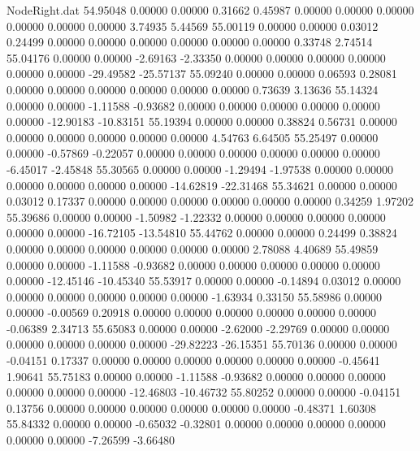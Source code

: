 \begin{filecontents}{NodeRight.dat}
  54.95048    0.00000    0.00000     0.31662    0.45987    0.00000    0.00000    0.00000    0.00000    0.00000    0.00000    3.74935    5.44569
  55.00119    0.00000    0.00000     0.03012    0.24499    0.00000    0.00000    0.00000    0.00000    0.00000    0.00000    0.33748    2.74514
  55.04176    0.00000    0.00000    -2.69163   -2.33350    0.00000    0.00000    0.00000    0.00000    0.00000    0.00000  -29.49582  -25.57137
  55.09240    0.00000    0.00000     0.06593    0.28081    0.00000    0.00000    0.00000    0.00000    0.00000    0.00000    0.73639    3.13636
  55.14324    0.00000    0.00000    -1.11588   -0.93682    0.00000    0.00000    0.00000    0.00000    0.00000    0.00000  -12.90183  -10.83151
  55.19394    0.00000    0.00000     0.38824    0.56731    0.00000    0.00000    0.00000    0.00000    0.00000    0.00000    4.54763    6.64505
  55.25497    0.00000    0.00000    -0.57869   -0.22057    0.00000    0.00000    0.00000    0.00000    0.00000    0.00000   -6.45017   -2.45848
  55.30565    0.00000    0.00000    -1.29494   -1.97538    0.00000    0.00000    0.00000    0.00000    0.00000    0.00000  -14.62819  -22.31468
  55.34621    0.00000    0.00000     0.03012    0.17337    0.00000    0.00000    0.00000    0.00000    0.00000    0.00000    0.34259    1.97202
  55.39686    0.00000    0.00000    -1.50982   -1.22332    0.00000    0.00000    0.00000    0.00000    0.00000    0.00000  -16.72105  -13.54810
  55.44762    0.00000    0.00000     0.24499    0.38824    0.00000    0.00000    0.00000    0.00000    0.00000    0.00000    2.78088    4.40689
  55.49859    0.00000    0.00000    -1.11588   -0.93682    0.00000    0.00000    0.00000    0.00000    0.00000    0.00000  -12.45146  -10.45340
  55.53917    0.00000    0.00000    -0.14894    0.03012    0.00000    0.00000    0.00000    0.00000    0.00000    0.00000   -1.63934    0.33150
  55.58986    0.00000    0.00000    -0.00569    0.20918    0.00000    0.00000    0.00000    0.00000    0.00000    0.00000   -0.06389    2.34713
  55.65083    0.00000    0.00000    -2.62000   -2.29769    0.00000    0.00000    0.00000    0.00000    0.00000    0.00000  -29.82223  -26.15351
  55.70136    0.00000    0.00000    -0.04151    0.17337    0.00000    0.00000    0.00000    0.00000    0.00000    0.00000   -0.45641    1.90641
  55.75183    0.00000    0.00000    -1.11588   -0.93682    0.00000    0.00000    0.00000    0.00000    0.00000    0.00000  -12.46803  -10.46732
  55.80252    0.00000    0.00000    -0.04151    0.13756    0.00000    0.00000    0.00000    0.00000    0.00000    0.00000   -0.48371    1.60308
  55.84332    0.00000    0.00000    -0.65032   -0.32801    0.00000    0.00000    0.00000    0.00000    0.00000    0.00000   -7.26599   -3.66480

\end{filecontents}
